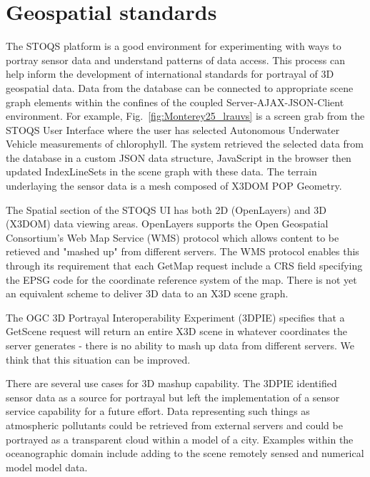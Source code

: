 \documentclass[annualconference]{acmsiggraph}  %
\begin{document}
\section{Geospatial standards}
The STOQS platform is a good environment for experimenting with ways to portray sensor data and understand patterns of data access. This process can help inform the development of international standards for portrayal of 3D geospatial data.
Data from the database can be connected to appropriate scene graph elements within the confines of the coupled Server-AJAX-JSON-Client environment. For example, 
Fig.~\ref{fig:Monterey25_lrauvs} is a screen grab from the STOQS User Interface where the user has selected Autonomous Underwater Vehicle measurements of chlorophyll. The system retrieved the selected data from the database in a custom JSON data structure, JavaScript in the browser then updated IndexLineSets in the scene graph with these data. The terrain underlaying the sensor data is a mesh composed of X3DOM POP Geometry.

The Spatial section of the STOQS UI has both 2D (OpenLayers) and 3D (X3DOM) data viewing areas. OpenLayers supports the Open Geospatial Consortium's Web Map Service (WMS) protocol which allows content to be retieved and "mashed up" from different servers. The WMS protocol enables this through its requirement that each GetMap request include a CRS field specifying the EPSG code for the coordinate reference system of the map.  There is not yet an equivalent scheme to deliver 3D data to an X3D scene graph.

The OGC 3D Portrayal Interoperability Experiment (3DPIE) \cite{3DPIE} specifies that a GetScene request will return an entire X3D scene in whatever coordinates the server generates - there is no ability to mash up data from different servers. We think that this situation can be improved. 

There are several use cases for 3D mashup capability. The 3DPIE identified sensor data as a source for portrayal but left the implementation of a sensor service capability for a future effort. Data representing such things as atmospheric pollutants could be retrieved from external servers and could be portrayed as a transparent cloud within a model of a city. Examples within the oceanographic domain include adding to the scene remotely sensed and numerical model model data.





\nocite{*}

\end{document}
